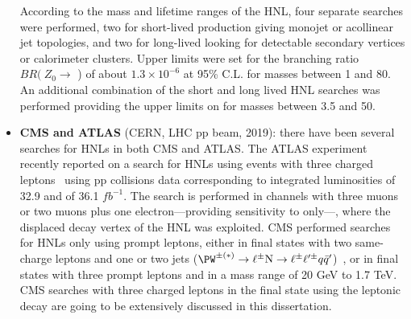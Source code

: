 \begin{itemize}
  According to the mass and lifetime ranges of the HNL, four separate searches were performed, two for short-lived \hnl production giving monojet or acollinear jet topologies, 
  and two for long-lived \hnl looking for detectable secondary vertices or calorimeter clusters.
 Upper limits were set for the branching ratio $BR (\: Z_0\rightarrow$ \hnl) of
 about $1.3 \times 10^{-6}$ at 95\% C.L. for \hnl masses between 1 and
 80\GeV. An additional combination of the short and long lived HNL searches was performed providing the upper limits on \mixpar for \hnl masses between 3.5 and
 50\GeV. 
\item \textbf{CMS and ATLAS} (CERN, LHC pp beam, 2019): there have been several searches for HNLs in both CMS and ATLAS.
The ATLAS experiment recently reported on a search for HNLs using events with three charged leptons~\cite{atlasintro2} using 
pp collisions data corresponding to integrated luminosities of 32.9
and of
36.1 $fb^{-1}$. 
The search is performed in channels with three muons or two muons plus
one electron---providing sensitivity  to \mixparm only---, where the 
displaced decay vertex of the HNL was exploited.
CMS performed searches for HNLs only using prompt leptons,
either in final states with two same-charge leptons and one or two jets
(\(\PW^{\pm(\ast)}\to\ell^{\pm}\hnl\to\ell^{\pm}\ell^{\prime\pm}q\bar{q}^{\prime}\))~\cite{Sirunyan:2018xiv},
or in final states with three prompt leptons and \ptmiss 
in a mass range of 20 GeV to 1.7 TeV.
CMS searches with three charged leptons in the final state using the leptonic \PW decay are going to be extensively discussed in this
dissertation.
\end{itemize}

